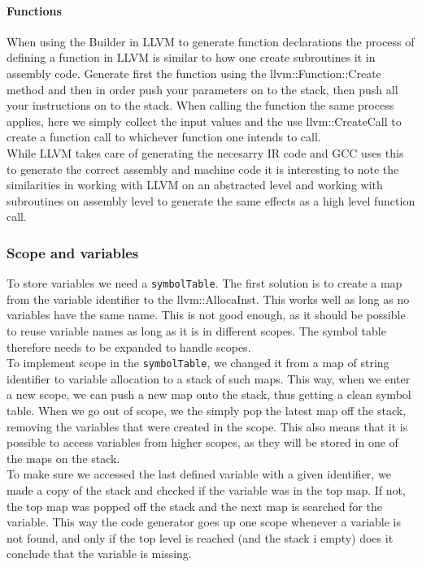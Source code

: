 \paragraph*{Functions}

When using the Builder in LLVM to generate function declarations the process of
defining a function in LLVM is similar to how one create subroutines it in assembly
code. Generate first the function using the llvm::Function::Create method and then in
order push your parameters on to the stack, then push all your instructions on to the
stack. When calling the function the same process applies, here we simply collect the
input values and the use llvm::CreateCall to create a function call to whichever
function one intends to call. \\

While LLVM takes care of generating the necesarry IR code and GCC uses this to
generate the correct assembly and machine code it is interesting to note the
similarities in working with LLVM on an abstracted level and working with subroutines on
assembly level to generate the same effects as a high level function call.


\subsubsection{Scope and variables}
To store variables we need a \texttt{symbolTable}. The first solution is to create a map from the variable identifier to the llvm::AllocaInst. This works well as long as no variables have the same name. This is not good enough, as it should be possible to reuse variable names as long as it is in different scopes. The symbol table therefore needs to be expanded to handle scopes.\\
To implement scope in the \texttt{symbolTable}, we changed it from a map of string identifier to variable allocation to a stack of such maps. This way, when we enter a new scope, we can push a new map onto the stack, thus getting a clean symbol table. When we go out of scope, we the simply pop the latest map off the stack, removing the variables that were created in the scope. This also means that it is possible to access variables from higher scopes, as they will be stored in one of the maps on the stack.\\

To make sure we accessed the last defined variable with a given identifier, we made a
copy of the stack and checked if the variable was in the top map. If not, the top map
was popped off the stack and the next map is searched for the variable. This way the
code generator goes up one scope whenever a variable is not found, and only if the
top level is reached (and the stack i empty) does it conclude that the variable is
missing.

